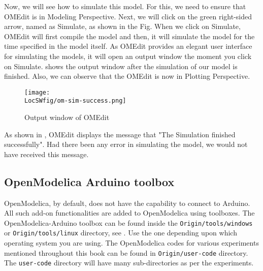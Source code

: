 Now, we will see how to simulate this model. For this, we need to ensure that OMEdit 
is in Modeling Perspective. Next, we will click on the green right-sided arrow, named as 
Simulate, as shown in the Fig. When we click on Simulate, OMEdit will first 
compile the model and then, it will simulate the model for the time specified in the model itself. 
As OMEdit provides an elegant user interface for simulating the models, 
it will open an output window the moment you click on Simulate. 
shows the output window after the simulation of our model is finished. Also, we can
observe that the OMEdit is now in Plotting Perspective. 

\begin{figure}
      \centering
      \texttt{[image: \\LocSWfig/om-sim-success.png]}
      \caption{Output window of OMEdit}
      \label{om-sim-success}
\end{figure}

As shown in , OMEdit displays the message that "The 
Simulation finished successfully". Had there been any error in simulating the model, 
we would not have received this message. 


\subsection{OpenModelica Arduino toolbox}
OpenModelica, by default, does not have the capability to connect to Arduino. 
All such add-on functionalities are added to OpenModelica using toolboxes. 
The OpenModelica-Arduino toolbox can be found inside
the {\tt Origin/tools/windows} or {\tt Origin/tools/linux} directory,
see .  Use the one depending upon
which operating system you are using. The OpenModelica codes for various
experiments mentioned throughout this book can be found in {\tt Origin/user-code} directory. The {\tt user-code} directory will have
many sub-directories as per the experiments. 

